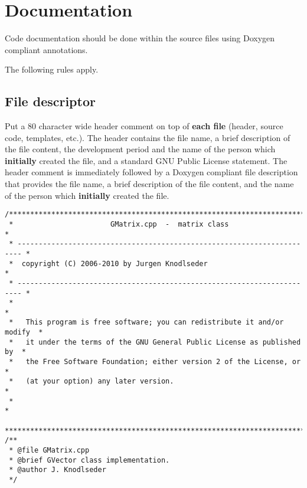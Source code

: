 \documentclass{article}[12pt,a4]
\begin{document}
\section{Documentation}

Code documentation should be done within the source files using Doxygen
compliant annotations.

The following rules apply.


\subsection{File descriptor}

Put a 80 character wide header comment on top of {\bf each file}
(header, source code, templates, etc.).
The header contains
the file name,
a brief description of the file content,
the development period and the name of the person which {\bf initially}
created the file, and
a standard GNU Public License statement.
The header comment is immediately followed by a Doxygen compliant
file description that provides
the file name,
a brief description of the file content, and
the name of the person which {\bf initially} created the file.
\begin{verbatim}
/***************************************************************************
 *                       GMatrix.cpp  -  matrix class                      *
 * ----------------------------------------------------------------------- *
 *  copyright (C) 2006-2010 by Jurgen Knodlseder                           *
 * ----------------------------------------------------------------------- *
 *                                                                         *
 *   This program is free software; you can redistribute it and/or modify  *
 *   it under the terms of the GNU General Public License as published by  *
 *   the Free Software Foundation; either version 2 of the License, or     *
 *   (at your option) any later version.                                   *
 *                                                                         *
 ***************************************************************************/
/**
 * @file GMatrix.cpp
 * @brief GVector class implementation.
 * @author J. Knodlseder
 */
\end{verbatim}
\end{document}
